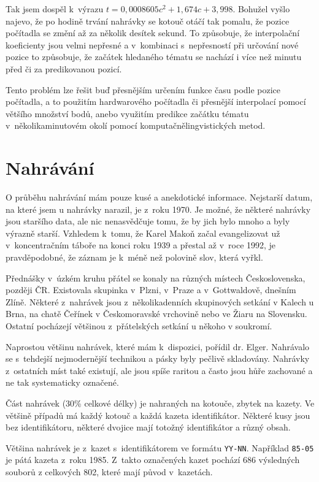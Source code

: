 Tak jsem dospěl k~výrazu $t = 0,0008605c^2 + 1,674c + 3,998$. Bohužel vyšlo
najevo, že po hodině trvání nahrávky se kotouč otáčí tak pomalu, že pozice
počítadla se změní až za několik desítek sekund. To způsobuje, že interpolační
koeficienty jsou velmi nepřesné a v~kombinaci s~nepřesností při určování nové
pozice to způsobuje, že začátek hledaného tématu se nachází i více než minutu
před či za predikovanou pozicí.

Tento problém lze řešit buď přesnějším určením funkce času podle pozice
počítadla, a to použitím hardwarového počítadla či přesnější interpolací
pomocí většího množství bodů, anebo využitím predikce začátku
tématu v~několikaminutovém okolí pomocí komputačnělingvistických metod.

\section{Nahrávání}
\label{sec:data:rec}

O průběhu nahrávání mám pouze kusé a anekdotické informace. Nejstarší datum, na
které jsem u nahrávky narazil, je z~roku 1970. Je možné, že některé nahrávky
jsou staršího data, ale nic nenasvědčuje tomu, že by jich bylo mnoho a byly
výrazně starší. Vzhledem k~tomu, že Karel Makoň začal evangelizovat už
v~koncentračním táboře na konci roku 1939 a přestal až v~roce 1992, je
pravděpodobné, že záznam je k~méně než polovině slov, která vyřkl.

Přednášky v~úzkém kruhu přátel se konaly na různých místech Československa,
později ČR.
Existovala skupinka v~Plzni, v~Praze a v~Gottwaldově, dnešním
Zlíně. Některé z~nahrávek jsou
z~několikadenních skupinových setkání v Kalech u Brna, na chatě Čeřínek v
Českomoravské vrchovině nebo ve Žiaru na Slovensku. Ostatní pocházejí většinou
z~přátelských setkání u někoho v soukromí.

Naprostou většinu nahrávek, které mám k~dispozici, pořídil dr. Elger.
Nahrávalo se s~tehdejší nejmodernější technikou a pásky byly pečlivě
skladovány. Nahrávky z~ostatních míst
také existují, ale jsou spíše raritou a často jsou hůře zachované a ne tak
systematicky označené.

Část nahrávek (30\% celkové délky) je nahraných na kotouče, zbytek na kazety. Ve
většině případů má každý kotouč a každá kazeta identifikátor. Některé kusy
jsou bez identifikátoru, některé dvojice mají totožný identifikátor a různý
obsah.

Většina nahrávek je z~kazet s~identifikátorem ve formátu \texttt{YY-NN}.
Například \texttt{85-05} je pátá kazeta z~roku 1985. Z~takto označených kazet
pochází 686 výsledných souborů z celkových 802, které mají původ v~kazetách.


